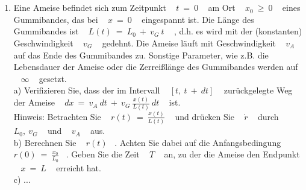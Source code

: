 


\newpage



\chapter{~}







\section{~}

~\\


\begin{enumerate}[leftmargin=*, labelsep=2em, itemsep=3em, label=\alph*)]
	
	
	
	\setcounter{tc}{0}
	
	\item
	
	
	Eine Ameise befindet sich zum Zeitpunkt ~ $t ~ = ~ 0$ ~ am Ort ~ $x_0 ~ \geq ~ 0$ ~ eines Gummibandes, das bei ~ $x ~ = ~ 0$ ~ eingespannt ist. Die Länge des Gummibandes ist ~ $L(t) ~ = ~ L_0 ~ + ~ v_G ~ t$ ~ , d.h. es wird mit der (konstanten) Geschwindigkeit ~ $v_G$ ~ gedehnt. Die Ameise läuft mit Geschwindigkeit ~ $v_A$ ~ auf das Ende des Gummibandes zu. Sonstige Parameter, wie z.B. die Lebensdauer der Ameise oder die Zerreißlänge des Gummibandes werden auf ~ $\infty$ ~ gesetzt. \\
	
	a) Verifizieren Sie, dass der im Intervall ~ $\left[ t, ~ t ~ + ~ dt \right]$ ~ zurückgelegte Weg der Ameise ~ $dx ~ = ~ v_A ~ dt ~ + ~ v_G ~ \frac{ x(t) }{ L(t) } ~ dt$ ~ ist. \\
	Hinweis: Betrachten Sie ~ $r(t) ~ = ~ \frac{ x(t) }{ L(t) }$ ~ und drücken Sie ~ $\dot{r}$ ~ durch ~ $L_0, ~ v_G$ ~ und ~ $v_A$ ~ aus. \\
	
	b) Berechnen Sie ~ $r(t)$ ~. Achten Sie dabei auf die Anfangsbedingung ~ $r(0) ~ = ~ \frac{x_0}{L_0}$ ~. Geben Sie die Zeit ~ $T$ ~ an, zu der die Ameise den Endpunkt ~ $x ~ = ~ L$ ~ erreicht hat. \\
	
	c) ...
	

\end{enumerate}
